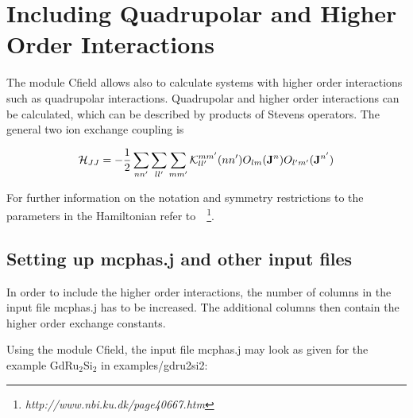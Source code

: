\section{Including Quadrupolar and Higher Order Interactions}
\label{qint}


The module {\prg Cfield} allows also to calculate systems with higher order interactions such
as quadrupolar interactions. Quadrupolar and higher order interactions can be calculated, which
can be described by products of Stevens operators. The general two ion exchange coupling is

\begin{equation}
\label{multipolehamiltonrepeated}
 {\mathcal H}_{JJ}=
             -\frac{1}{2}  \sum_{nn'} \sum_ {ll'} \sum_{mm'}
     {\mathcal K}_{ll'}^{mm'}(nn') O_{lm}({\mathbf J}^n) O_{l'm'}({\mathbf J}^{n'})
\end{equation}

For further information on the notation and symmetry restrictions to the
parameters in the Hamiltonian refer to~\cite{jensen91-1}~\footnote{\em http://www.nbi.ku.dk/page40667.htm}.


\subsection{Setting up {\prg mcphas.j} and other input files}

In order to include the higher order interactions, the number of columns in the input file
{\prg mcphas.j} has to be increased. The additional columns then contain the higher order
exchange constants.

Using the module {\prg Cfield}, the input file {\prg mcphas.j} may look as given for the 
example GdRu$_2$Si$_2$ in {\prg examples/gdru2si2}:


